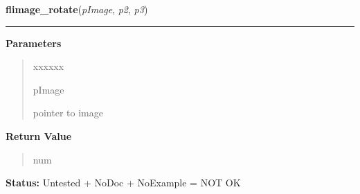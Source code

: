 \hspace{.8\funcindent}\begin{boxedminipage}{\funcwidth}

    \raggedright \textbf{flimage\_rotate}(\textit{pImage}, \textit{p2}, \textit{p3})

    \vspace{-1.5ex}

    \rule{\textwidth}{0.5\fboxrule}
\setlength{\parskip}{2ex}
\setlength{\parskip}{1ex}
      \textbf{Parameters}
      \vspace{-1ex}

      \begin{quote}
        \begin{Ventry}{xxxxxx}

          \item[pImage]

          pointer to image

        \end{Ventry}

      \end{quote}

      \textbf{Return Value}
    \vspace{-1ex}

      \begin{quote}
      num

      \end{quote}

\textbf{Status:} Untested + NoDoc + NoExample = NOT OK



    \end{boxedminipage}

    \label{xformslib:library:flimage_flip}

    \vspace{0.5ex}


